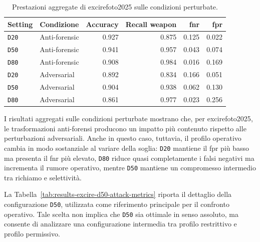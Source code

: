 \begin{table}[H]
\centering
\caption{Prestazioni aggregate di \gls{excirefoto2025} sulle condizioni perturbate.}
\label{tab:results-excire-perturbed-summary}
\small
\begin{tabular}{l l r r r r}
\toprule
\textbf{Setting} &
\textbf{Condizione} &
\textbf{Accuracy} &
\textbf{Recall weapon} &
\textbf{\gls{fnr}} &
\textbf{\gls{fpr}} \\
\midrule

\texttt{D20} & Anti-forensic & 0.927 & 0.875 & 0.125 & 0.022 \\
\texttt{D50} & Anti-forensic & 0.941 & 0.957 & 0.043 & 0.074 \\
\texttt{D80} & Anti-forensic & 0.908 & 0.984 & 0.016 & 0.169 \\

\midrule

\texttt{D20} & Adversarial & 0.892 & 0.834 & 0.166 & 0.051 \\
\texttt{D50} & Adversarial & 0.904 & 0.938 & 0.062 & 0.130 \\
\texttt{D80} & Adversarial & 0.861 & 0.977 & 0.023 & 0.256 \\

\bottomrule
\end{tabular}
\end{table}

I risultati aggregati sulle condizioni perturbate mostrano che, per
\gls{excirefoto2025}, le trasformazioni anti-forensi producono un impatto più
contenuto rispetto alle perturbazioni adversariali. Anche in questo caso,
tuttavia, il profilo operativo cambia in modo sostanziale al variare della
soglia: \texttt{D20} mantiene il \gls{fpr} più basso ma presenta il \gls{fnr}
più elevato, \texttt{D80} riduce quasi completamente i falsi negativi ma
incrementa il rumore operativo, mentre \texttt{D50} mantiene un compromesso
intermedio tra richiamo e selettività.

La Tabella~\ref{tab:results-excire-d50-attack-metrics} riporta il dettaglio
della configurazione \texttt{D50}, utilizzata come riferimento principale per il
confronto operativo. Tale scelta non implica che \texttt{D50} sia ottimale in
senso assoluto, ma consente di analizzare una configurazione intermedia tra
profilo restrittivo e profilo permissivo.

